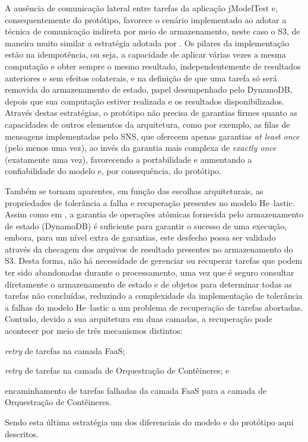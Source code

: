\documentclass[english,brazilian]{UNISINOSmonografia} %
\begin{document}
A ausência de comunicação lateral entre tarefas da aplicação jModelTest e, consequentemente do protótipo, favorece o cenário implementado ao adotar a técnica de comunicação indireta por meio de armazenamento, neste caso o S3, de maneira muito similar a estratégia adotada por .
%
Os pilares da implementação estão na idempotência, ou seja, a capacidade de aplicar várias vezes a mesma computação e obter sempre o mesmo resultado, independentemente de resultados anteriores e sem efeitos colaterais, 
e na definição de que uma tarefa só será removida do armazenamento de estado, papel desempenhado pelo DynamoDB, depois que sua computação estiver realizada e os resultados disponibilizados.
%
Através destas estratégias, o protótipo não precisa de garantias firmes quanto as capacidades de outros elementos da arquitetura, como por exemplo, as filas de mensagens implementadas pelo SNS, que oferecem apenas garantias \textit{at least once} (pelo menos uma vez), ao invés da garantia mais complexa de \textit{exactly once} (exatamente uma vez), favorecendo a portabilidade e aumentando a confiabilidade do modelo e, por consequência, do protótipo.


Também se tornam aparentes, em função das escolhas arquiteturais, as propriedades de tolerância a falha e recuperação presentes no modelo \textsf{He}--lastic.
%
Assim como em , a garantia de operações atômicas fornecida pelo armazenamento de estado (DynamoDB) é suficiente para garantir o sucesso de uma execução, embora, para um nível extra de garantias, este desfecho possa ser validado através da checagem dos arquivos de resultado presentes no armazenamento do S3.
%
Desta forma, não há necessidade de gerenciar ou recuperar tarefas que podem ter sido abandonadas durante o processamento, uma vez que é seguro consultar diretamente o armazenamento de estado e de objetos para determinar todas as tarefas não concluídas, reduzindo a complexidade da implementação de tolerância a falhas do modelo \textsf{He}--lastic a um problema de recuperação de tarefas abortadas.
%
Contudo, devido a sua arquitetura em duas camadas, a recuperação pode acontecer por meio de três mecanismos distintos: 
\begin{inparaenum} 
	\item \textit{retry} de tarefas na camada FaaS;
	\item \textit{retry} de tarefas na camada de Orquestração de Contêineres; e
	\item encaminhamento de tarefas falhadas da camada FaaS para a camada de Orquestração de Contêineres.
\end{inparaenum}
Sendo esta última estratégia um dos diferenciais do modelo e do protótipo aqui descritos.
\end{document}
